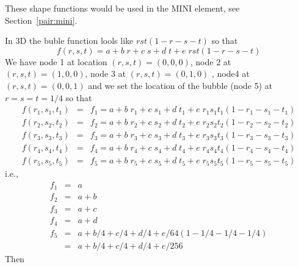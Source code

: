 These shape functions would be used in the MINI element, see Section~\ref{pair:mini}.

In 3D the buble function lools like $rst(1-r-s-t)$ so that 
\[
f(r,s,t)=a+b\; r+c\; s+d\; t+e \; rst(1-r-s-t)
\]
We have node 1 at location $(r,s,t)=(0,0,0)$, node 2 at $(r,s,t)=(1,0,0)$, node 3 at $(r,s,t)=(0,1,0)$ , 
node4 at $(r,s,t)=(0,0,1)$ and we 
set the location of the bubble (node 5) at $r=s=t=1/4$ so that 
\begin{eqnarray}
f(r_1,s_1,t_1)&=&f_1 = a+b\; r_1+c\; s_1+d\; t_1+e\; r_1s_1t_1(1-r_1-s_1-t_1) \\
f(r_2,s_2,t_2)&=&f_2 = a+b\; r_2+c\; s_2+d\; t_2+e\; r_2s_2t_2(1-r_2-s_2-t_2) \\
f(r_3,s_3,t_3)&=&f_3 = a+b\; r_3+c\; s_3+d\; t_3+e\; r_3s_3t_3(1-r_3-s_3-t_3) \\
f(r_4,s_4,t_4)&=&f_4 = a+b\; r_4+c\; s_4+d\; t_4+e\; r_4s_4t_4(1-r_4-s_4-t_4) \\ 
f(r_5,s_5,t_5)&=&f_5 = a+b\; r_5+c\; s_5+d\; t_5+e\; r_5s_5t_5(1-r_5-s_5-t_5) 
\end{eqnarray}
i.e.,
\begin{eqnarray}
f_1 &=& a\\
f_2 &=& a+b\\
f_3 &=& a+c\\
f_4 &=& a+d\\
f_5 &=& a+b/4+c/4+d/4+e/64 (1-1/4-1/4-1/4) \\ 
    &=& a+b/4+c/4+d/4+e/256  
\end{eqnarray}
Then 

